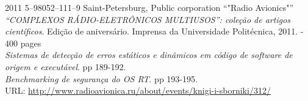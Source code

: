 

\begin{entrylist}
    \entry
    {2011}
    {5–98052–111–9}
    {Saint-Petersburg, Public corporation \enquote{"Radio Avionics"}}
    {\textit{\enquote{COMPLEXOS RÁDIO-ELETRÔNICOS MULTIUSOS}: coleção de artigos científicos}. Edição de aniversário. Imprensa da Universidade Politécnica, 2011. - 400 pages \\
    \textit{Sistemas de detecção de erros estáticos e dinâmicos em código de software de origem e executável}. pp 189-192. \\
    \textit{Benchmarking de segurança do OS RT}. pp 193-195.\\
    URL: \url{http://www.radioavionica.ru/about/events/knigi-i-sborniki/312/}
    }
\end{entrylist}
